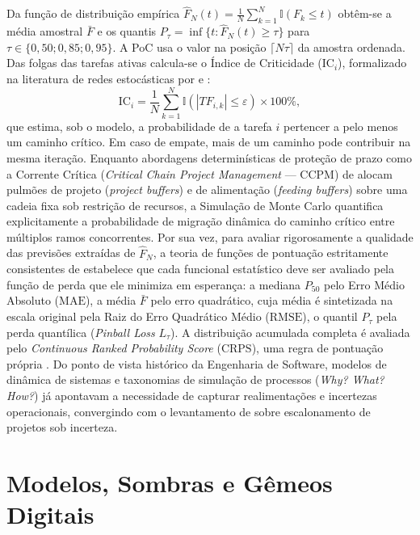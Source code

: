 \documentclass[12pt,openany,oneside,a4paper,english,brazilian,sumario=tradicional]{abntex2}
\newcommand{\IC}{\mathrm{IC}}
\begin{document}
Da função de distribuição empírica $\hat{F}_N(t) = \frac{1}{N}\sum_{k=1}^N \mathbb{I}(F_k \le t)$ obtêm-se a média amostral $\bar{F}$ e os quantis $P_{\tau}=\inf\{t:\hat{F}_N(t)\ge\tau\}$ para $\tau\in\{0{,}50;0{,}85;0{,}95\}$. A PoC usa o valor na posição $\lceil N\tau\rceil$ da amostra ordenada. Das folgas das tarefas ativas calcula-se o Índice de Criticidade ($\IC_i$), formalizado na literatura de redes estocásticas por  e :
\begin{equation}
\IC_i=\frac{1}{N}\sum_{k=1}^{N}\mathbb{I}\left(|TF_{i,k}| \le \varepsilon\right)\times 100\%,
\end{equation}
que estima, sob o modelo, a probabilidade de a tarefa $i$ pertencer a pelo menos um caminho crítico. Em caso de empate, mais de um caminho pode contribuir na mesma iteração. Enquanto abordagens determinísticas de proteção de prazo como a Corrente Crítica (\textit{Critical Chain Project Management} --- CCPM) de  alocam pulmões de projeto (\textit{project buffers}) e de alimentação (\textit{feeding buffers}) sobre uma cadeia fixa sob restrição de recursos, a Simulação de Monte Carlo quantifica explicitamente a probabilidade de migração dinâmica do caminho crítico entre múltiplos ramos concorrentes. Por sua vez, para avaliar rigorosamente a qualidade das previsões extraídas de $\hat{F}_N$, a teoria de funções de pontuação estritamente consistentes de  estabelece que cada funcional estatístico deve ser avaliado pela função de perda que ele minimiza em esperança: a mediana $P_{50}$ pelo Erro Médio Absoluto ($\mathrm{MAE}$), a média $\bar{F}$ pelo erro quadrático, cuja média é sintetizada na escala original pela Raiz do Erro Quadrático Médio ($\mathrm{RMSE}$), o quantil $P_{\tau}$ pela perda quantílica (\textit{Pinball Loss} $L_{\tau}$). A distribuição acumulada completa é avaliada pelo \textit{Continuous Ranked Probability Score} ($\mathrm{CRPS}$), uma regra de pontuação própria \cite{gneiting2007}. Do ponto de vista histórico da Engenharia de Software, modelos de dinâmica de sistemas \cite{abdelhamid1991} e taxonomias de simulação de processos (\textit{Why? What? How?}) \cite{kellner1999} já apontavam a necessidade de capturar realimentações e incertezas operacionais, convergindo com o levantamento de  sobre escalonamento de projetos sob incerteza.

\section{Modelos, Sombras e Gêmeos Digitais}\label{sec:gemeos}
\end{document}
